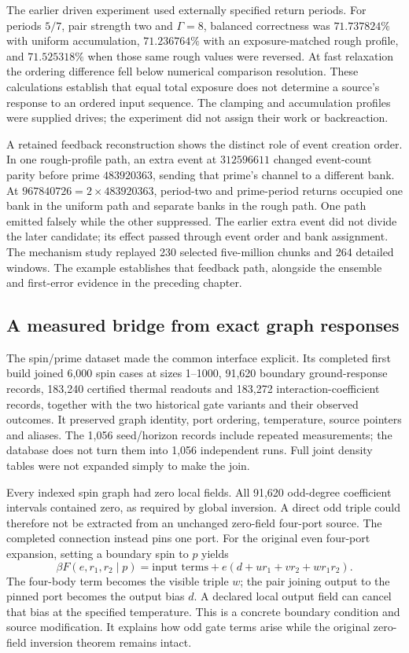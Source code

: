 The earlier driven experiment used externally specified return periods. For periods $5/7$, pair strength two and $\Gamma=8$, balanced correctness was $71.737824\%$ with uniform accumulation, $71.236764\%$ with an exposure-matched rough profile, and $71.525318\%$ when those same rough values were reversed. At fast relaxation the ordering difference fell below numerical comparison resolution. These calculations establish that equal total exposure does not determine a source's response to an ordered input sequence. The clamping and accumulation profiles were supplied drives; the experiment did not assign their work or backreaction.

A retained feedback reconstruction shows the distinct role of event creation order. In one rough-profile path, an extra event at $312596611$ changed event-count parity before prime $483920363$, sending that prime's channel to a different bank. At $967840726=2\times483920363$, period-two and prime-period returns occupied one bank in the uniform path and separate banks in the rough path. One path emitted falsely while the other suppressed. The earlier extra event did not divide the later candidate; its effect passed through event order and bank assignment. The mechanism study replayed 230 selected five-million chunks and 264 detailed windows. The example establishes that feedback path, alongside the ensemble and first-error evidence in the preceding chapter.

\subsection{A measured bridge from exact graph responses}

The spin/prime dataset made the common interface explicit. Its completed first build joined 6,000 spin cases at sizes 1--1000, 91,620 boundary ground-response records, 183,240 certified thermal readouts and 183,272 interaction-coefficient records, together with the two historical gate variants and their observed outcomes. It preserved graph identity, port ordering, temperature, source pointers and aliases. The 1,056 seed/horizon records include repeated measurements; the database does not turn them into 1,056 independent runs. Full joint density tables were not expanded simply to make the join.

Every indexed spin graph had zero local fields. All 91,620 odd-degree coefficient intervals contained zero, as required by global inversion. A direct odd triple could therefore not be extracted from an unchanged zero-field four-port source. The completed connection instead pins one port. For the original even four-port expansion, setting a boundary spin to $p$ yields
\[
 \beta F(e,r_1,r_2\mid p)
 =\text{input terms}+e(d+ur_1+vr_2+wr_1r_2).
\]
The four-body term becomes the visible triple $w$; the pair joining output to the pinned port becomes the output bias $d$. A declared local output field can cancel that bias at the specified temperature. This is a concrete boundary condition and source modification. It explains how odd gate terms arise while the original zero-field inversion theorem remains intact.

